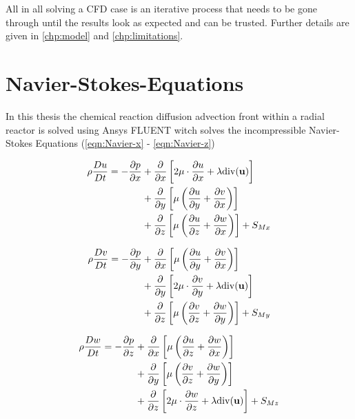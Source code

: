 \documentclass[../thesis.tex]{subfiles}
\begin{document}
All in all solving a CFD case is an iterative process that needs to be gone through until the results look as expected and can be trusted. Further details are given in \autoref{chp:model} and \autoref{chp:limitations}.

\section{Navier-Stokes-Equations}

In this thesis the chemical reaction diffusion advection front within a radial reactor is solved using Ansys FLUENT witch solves the incompressible Navier-Stokes Equations (\autoref{eqn:Navier-x} - \autoref{eqn:Navier-z})

\begin{equation}
	\label{eqn:Navier-x}
	\begin{aligned}
	\rho \dfrac{Du}{Dt} = - \dfrac{\partial p}{\partial x}
		& + \dfrac{\partial}{\partial x} \left[
				2 \mu \cdot \dfrac{\partial u}{\partial x} + \lambda \mathrm{div}(\bold{u})
			\right] \\
		& + \dfrac{\partial}{\partial y} \left[
		 \mu  \left( \dfrac{\partial u}{\partial y} + \dfrac{\partial v}{\partial x} \right)
		\right] \\
		& + \dfrac{\partial}{\partial z} \left[
		\mu  \left( \dfrac{\partial u}{\partial z} + \dfrac{\partial w}{\partial x} \right)
		\right] +
		S_{Mx}
	\end{aligned}
\end{equation}

\begin{equation}
	\label{eqn:Navier-y}
	\begin{aligned}
		\rho \dfrac{Dv}{Dt} = - \dfrac{\partial p}{\partial y}
		& + \dfrac{\partial}{\partial x} \left[
		\mu  \left( \dfrac{\partial u}{\partial y} + \dfrac{\partial v}{\partial x} \right)
		\right] \\
		& + \dfrac{\partial}{\partial y} \left[
		2 \mu \cdot \dfrac{\partial v}{\partial y} + \lambda \mathrm{div}(\bold{u})
		\right] \\
		& + \dfrac{\partial}{\partial z} \left[
		\mu  \left( \dfrac{\partial v}{\partial z} + \dfrac{\partial w}{\partial y} \right)
		\right] +
		S_{My}
	\end{aligned}
\end{equation}

\begin{equation}
	\label{eqn:Navier-z}
	\begin{aligned}
		\rho \dfrac{Dw}{Dt} = - \dfrac{\partial p}{\partial z}
		& + \dfrac{\partial}{\partial x} \left[
		\mu  \left( \dfrac{\partial u}{\partial z} + \dfrac{\partial w}{\partial x} \right)
		\right] \\
		& + \dfrac{\partial}{\partial y} \left[
		\mu  \left( \dfrac{\partial v}{\partial z} + \dfrac{\partial w}{\partial y} \right)
		\right] \\
		& + \dfrac{\partial}{\partial z} \left[
		2 \mu \cdot \dfrac{\partial w}{\partial z} + \lambda \mathrm{div}(\bold{u})
		\right] +
		S_{Mz}
	\end{aligned}
\end{equation}
\end{document}
